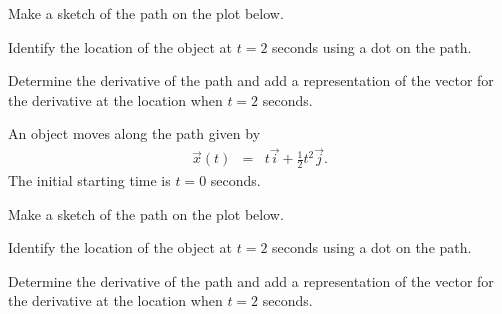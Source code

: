 \begin{problem}
  \begin{subproblem}
  \item Make a sketch of the path on the plot below.

    \scalebox{0.7}{}

  \item Identify the location of the object at $t=2$ seconds using a
    dot on the path.
  \item Determine the derivative of the path and add a representation
    of the vector for the derivative at the location when $t=2$
    seconds.
    \vspace{5em}
  \end{subproblem}

  \clearpage

\item An object moves along the path given by
  \begin{eqnarray*}
    \vec{x}(t) & = & t \vec{i} + \frac{1}{2} t^2 \vec{j}.
  \end{eqnarray*}
  The initial starting time is $t=0$ seconds.

  \begin{subproblem}
  \item Make a sketch of the path on the plot below.

    \scalebox{0.7}{}

  \item Identify the location of the object at $t=2$ seconds using a
    dot on the path.
  \item Determine the derivative of the path and add a representation
    of the vector for the derivative at the location when $t=2$
    seconds.
    \vspace{5em}
  \end{subproblem}

\end{problem}

\postClass

